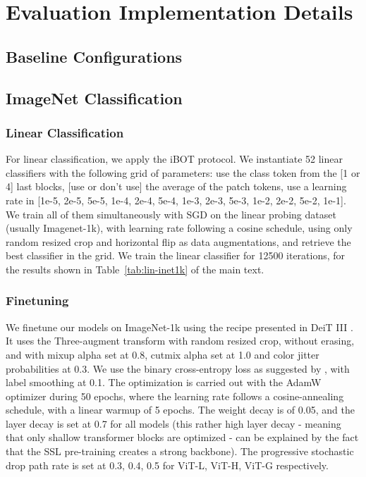 
\section{Evaluation Implementation Details}

\subsection{Baseline Configurations}




\subsection{ImageNet Classification}


\subsubsection{Linear Classification}
For linear classification, we apply the iBOT protocol. 
We instantiate 52 linear classifiers with the following grid of parameters: use the class token from the [1 or 4] last blocks, [use or don't use] the average of the patch tokens, use a learning rate in [1e-5, 2e-5, 5e-5, 1e-4, 2e-4, 5e-4, 1e-3, 2e-3, 5e-3, 1e-2, 2e-2, 5e-2, 1e-1]. 
We train all of them simultaneously with SGD on the linear probing dataset (usually Imagenet-1k), with learning rate following a cosine schedule, using only random resized crop and horizontal flip as data augmentations, and retrieve the best classifier in the grid. 
We train the linear classifier for 12500 iterations, for the results shown in Table~\ref{tab:lin-inet1k} of the main text.



\subsubsection{Finetuning}
We finetune our models on ImageNet-1k using the recipe presented in DeiT III \cite{touvron2022deit}. 
It uses the Three-augment transform with random resized crop, without erasing, and with mixup alpha set at 0.8, cutmix alpha set at 1.0 and color jitter probabilities at 0.3.
We use the binary cross-entropy loss as suggested by \cite{wightman2021resnet}, with label smoothing at 0.1.
The optimization is carried out with the AdamW~\cite{loshchilov2018fixing} optimizer during 50 epochs, where the learning rate follows a cosine-annealing schedule, with a linear warmup of 5 epochs.
The weight decay is of 0.05, and the layer decay is set at 0.7 for all models (this rather high layer decay - meaning that only shallow transformer blocks are optimized - can be explained by the fact that the SSL pre-training creates a strong backbone). 
The progressive stochastic drop path rate is set at 0.3, 0.4, 0.5 for ViT-L, ViT-H, ViT-G respectively.



